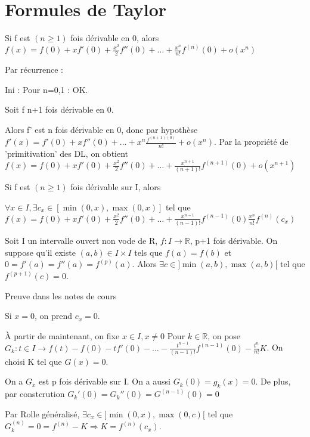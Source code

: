 \documentclass[french]{yLectureNote}
\begin{document}
\section{Formules de Taylor}
\begin{theorem}
 Si f est $(n\geq 1)$ fois dérivable en 0, alors \(f(x) = f(0)+xf'(0)+\frac{x^2}{2} f''(0)+\dots + \frac{x^n}{n!}f^{(n)}(0)+o(x^n)\)
\end{theorem}
\begin{myproof}
Par récurrence :

Ini : Pour n=0,1 : OK.

Soit f n+1 fois dérivable en 0.

Alors f' est n fois dérivable en 0, donc par hypothèse $f'(x) = f'(0) + xf''(0)+\dots+x^n\frac{f^{(n+1)(0)}}{n!} + o(x^n)$. Par la propriété de 'primitivation' des DL, on obtient \(f(x) = f(0) + xf'(0) + \frac{x^2}{2}f''(0)+\dots+\frac{x^{n+1}}{(n+1)!}f^{(n+1)}(0)+o(x^{n+1})\)
\end{myproof}
\begin{theorem}
 Si f est \((n\geq 1)\) fois dérivable sur I, alors

 \(\forall x\in I, \exists c_x\)\( \in[\min(0,x), \max(0,x)]\) tel que \(f(x) = f(0) + xf'(0) + \frac{x^2}{2}f''(0)+\dots+\frac{x^{n-1}}{(n-1)!}f^{(n-1)}(0)\frac{x^n}{n!}f^{(n)}(c_x)\)
\end{theorem}
\begin{proposition}
Soit I un intervalle ouvert non vode de R, \(f:I\to \mathbb{R}\), p+1 fois dérivable. On suppose qu'il existe \((a,b)\in I\times I\) tels que \(f(a) = f(b)\) et \(0 = f'(a) = f''(a) = f^{(p)}(a)\). Alors \(\exists c \in]\min(a,b),\max(a,b)[\) tel que \(f^{(p+1)}(c) = 0\).
\end{proposition}
\begin{myproof}
Preuve dans les notes de cours
\end{myproof}
\begin{myproof}
Si \(x=0\), on prend \(c_x =0\).

À partir de maintenant, on fixe \(x\in I, x\neq 0\) Pour \(k\in\mathbb{R}\), on pose \(G_k : t\in I\to f(t)-f(0)-tf'(0)-\dots-\frac{t^{n-1}}{(n-1)!}f^{(n-1)}(0) - \frac{t^n}{n!}K\). On choisi K tel que \(G(x) = 0\).

On a \(G_x\) est p fois dérivable sur I. On a aussi \(G_k(0) = g_k(x) = 0\). De plus, par constcrution \(G_k'(0) = G_k''(0) = G^{(n-1)}(0) = 0\)

Par Rolle généralisé, \(\exists c_x \in ]\min(0,x),\max(0,c)[\) tel que \(G_k^{(n)} = 0 = f^{(n)} - K \Rightarrow K = f^{(n)}(c_x)\).
\end{myproof}
\end{document}
